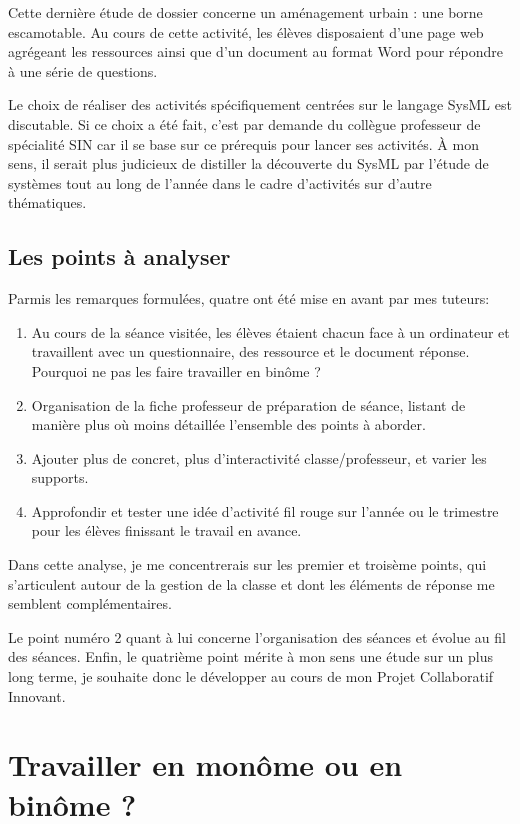 \documentclass[pdftex,a4paper,12pt]{article}
\begin{document}
	Cette dernière étude de dossier concerne un aménagement urbain : une borne escamotable.
	Au cours de cette activité, les élèves disposaient d'une page web agrégeant les ressources ainsi que
	d'un document au format Word pour répondre à une série de questions. 
	
	Le choix de réaliser des activités spécifiquement centrées sur le langage SysML est discutable. 
	Si ce choix a été fait, c'est par demande du collègue professeur de spécialité SIN car il se base sur ce prérequis pour lancer ses activités.
	À mon sens, il serait plus judicieux de distiller la découverte du SysML par l'étude de systèmes tout au long de l'année 
	dans le cadre d'activités sur d'autre thématiques.

	\subsection{Les points à analyser}
	Parmis les remarques formulées, quatre ont été mise en avant par mes tuteurs:
	\begin{enumerate}
		\item Au cours de la séance visitée, les élèves étaient chacun face à un ordinateur et travaillent avec un questionnaire, des ressource et le document réponse. 
			Pourquoi ne pas les faire travailler en binôme ?
		\item Organisation de la fiche professeur de préparation de séance, listant de manière plus où moins détaillée l'ensemble des points à aborder.
		\item Ajouter plus de concret, plus d'interactivité classe/professeur, et varier les supports.
		\item Approfondir et tester une idée d'activité \og{}fil rouge\fg{} sur l'année ou le trimestre pour les élèves finissant le travail en avance.
	\end{enumerate}

	Dans cette analyse, je me concentrerais sur les premier et troisème points, qui s'articulent autour de la gestion de la classe 
	et dont les éléments de réponse me semblent complémentaires.

	Le point numéro 2 quant à lui concerne l'organisation des séances et évolue au fil des séances.
	Enfin, le quatrième point mérite à mon sens une étude sur un plus long terme, je souhaite donc le développer au cours de mon \og{}Projet Collaboratif Innovant\fg{}.

	\section{Travailler en monôme ou en binôme ?}
\end{document}
